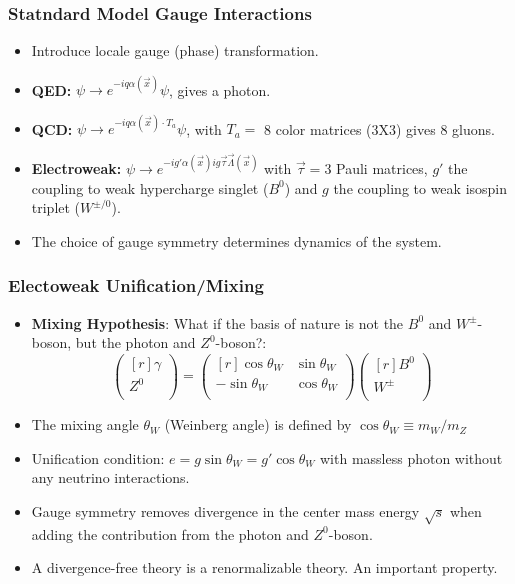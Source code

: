   \subsubsection{Statndard Model Gauge Interactions}
  \begin{itemize}
    \item Introduce locale gauge (phase) transformation. 
    \item \textbf{QED:} $ψ → e^{-iqα(\vec{x})}ψ$, gives a photon. 
    \item \textbf{QCD:} $ψ → e^{-iqα(\vec{x}) ⋅ T_{a}}ψ$, with $T_a = $ 8 color matrices (3X3) gives 8 gluons.
    \item \textbf{Electroweak:} $ψ → e^{-ig'α(\vec{x}) ig \vec{τ} \vec{Λ}(\vec{x})}$ with $\vec{τ} = $3 Pauli matrices, $g'$ the coupling to weak hypercharge singlet ($B^{0}$) and $g$ the coupling to weak isospin triplet ($W^{± /0}$).
    \item The choice of gauge symmetry determines dynamics of the system. 
  \end{itemize}

  \subsubsection{Electoweak Unification/Mixing}
  \begin{itemize}
    \item \textbf{Mixing Hypothesis}: What if the basis of nature is not the $B^{0}$ and $W^{±}$-boson, but the photon and $Z^{0}$-boson?:
    \begin{equation}
      \begin{pmatrix*}[r]
        γ \\
        Z^{0} \\
      \end{pmatrix*} = 
      \begin{pmatrix*}[r]
        \cos θ_{W} & \sin θ_{W} \\
        -\sin θ_{W} & \cos θ_{W} \\
      \end{pmatrix*}
      \begin{pmatrix*}[r]
        B^{0} \\
        W^{±} \\
      \end{pmatrix*}
    \end{equation}
    \item The mixing angle $θ_{W}$ (Weinberg angle) is defined by $\cos θ_{W} ≡ m_{W} / m_{Z}$
    \item Unification condition: $e = g \sin θ_{W} = g' \cos θ_{W}$ with massless photon without any neutrino interactions. 
    \item Gauge symmetry removes divergence in the center mass energy $\sqrt{s}$ when adding the contribution from the photon and $Z^{0}$-boson.
    \item A divergence-free theory is a renormalizable theory. An important property. 
  \end{itemize}
  
